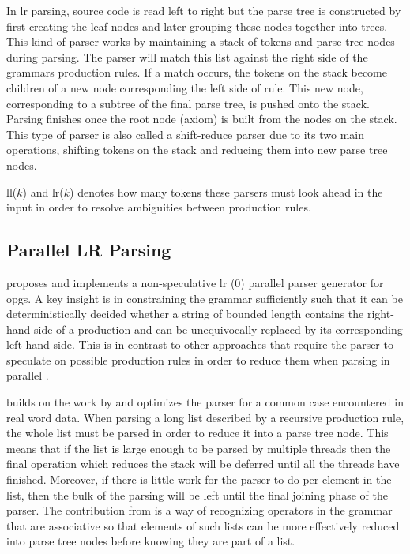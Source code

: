 In \gls{lr} parsing, source code is read left to right but the parse tree is
constructed by first creating the leaf nodes and later grouping these nodes
together into trees. This kind of parser works by maintaining a stack of tokens
and parse tree nodes during parsing. The parser will match this list against
the right side of the grammars production rules. If a match occurs, the tokens
on the stack become children of a new node corresponding the left side of rule.
This new node, corresponding to a subtree of the final parse tree, is pushed
onto the stack. Parsing finishes once the root node (axiom) is built from the
nodes on the stack. This type of parser is also called a shift-reduce parser due
to its two main operations, shifting tokens on the stack and reducing them into
new parse tree nodes.

\gls{ll}($k$) and \gls{lr}($k$) denotes how many tokens these parsers must look
ahead in the input in order to resolve ambiguities between production rules.

\subsection{Parallel LR Parsing} \label{parallel_lr_parsing}

\cite{barenghi_parallel_2015} proposes and implements a non-speculative \gls{lr}
(0) parallel parser generator for \gls{opg}s. A key insight is in constraining
the grammar sufficiently such that it can be deterministically decided whether
a string of bounded length contains the right-hand side of a production
and can be unequivocally replaced by its corresponding left-hand side. This
is in contrast to other approaches that require the parser to speculate on
possible production rules in order to reduce them when parsing in parallel
\citep{mickunas_parallel_1978}.

\cite{li_associative_2023} builds on the work by \cite{barenghi_parallel_2015}
and optimizes the parser for a common case encountered in real word data. When
parsing a long list described by a recursive production rule, the whole list
must be parsed in order to reduce it into a parse tree node. This means that
if the list is large enough to be parsed by multiple threads then the final
operation which reduces the stack will be deferred until all the threads have
finished. Moreover, if there is little work for the parser to do per element
in the list, then the bulk of the parsing will be left until the final joining
phase of the parser. The contribution from \cite{li_associative_2023} is a way
of recognizing operators in the grammar that are associative so that elements of
such lists can be more effectively reduced into parse tree nodes before knowing
they are part of a list.


